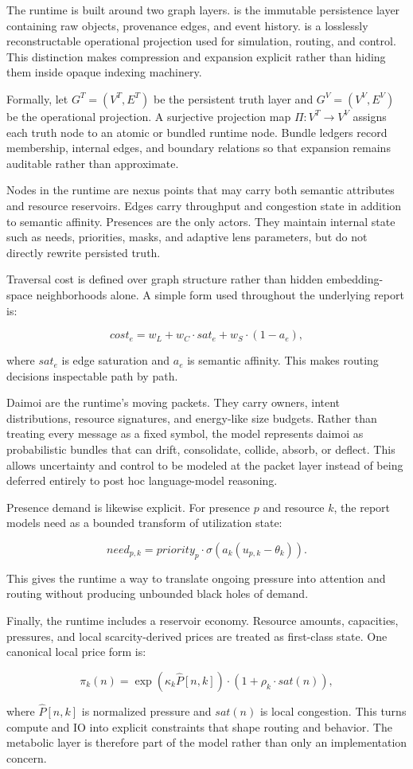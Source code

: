 The runtime is built around two graph layers. \truthgraph{} is the immutable persistence layer containing raw objects, provenance edges, and event history. \viewgraph{} is a losslessly reconstructable operational projection used for simulation, routing, and control. This distinction makes compression and expansion explicit rather than hiding them inside opaque indexing machinery.

Formally, let \(G^T=(V^T,E^T)\) be the persistent truth layer and \(G^V=(V^V,E^V)\) be the operational projection. A surjective projection map \(\Pi:V^T \to V^V\) assigns each truth node to an atomic or bundled runtime node. Bundle ledgers record membership, internal edges, and boundary relations so that expansion remains auditable rather than approximate.

Nodes in the runtime are nexus points that may carry both semantic attributes and resource reservoirs. Edges carry throughput and congestion state in addition to semantic affinity. Presences are the only actors. They maintain internal state such as needs, priorities, masks, and adaptive lens parameters, but do not directly rewrite persisted truth.

Traversal cost is defined over graph structure rather than hidden embedding-space neighborhoods alone. A simple form used throughout the underlying report is:

\[
cost_e = w_L + w_C \cdot sat_e + w_S \cdot (1-a_e),
\]

where \(sat_e\) is edge saturation and \(a_e\) is semantic affinity. This makes routing decisions inspectable path by path.

Daimoi are the runtime's moving packets. They carry owners, intent distributions, resource signatures, and energy-like size budgets. Rather than treating every message as a fixed symbol, the model represents daimoi as probabilistic bundles that can drift, consolidate, collide, absorb, or deflect. This allows uncertainty and control to be modeled at the packet layer instead of being deferred entirely to post hoc language-model reasoning.

Presence demand is likewise explicit. For presence \(p\) and resource \(k\), the report models need as a bounded transform of utilization state:

\[
need_{p,k} = priority_p \cdot \sigma\!\left(a_k(u_{p,k}-\theta_k)\right).
\]

This gives the runtime a way to translate ongoing pressure into attention and routing without producing unbounded black holes of demand.

Finally, the runtime includes a reservoir economy. Resource amounts, capacities, pressures, and local scarcity-derived prices are treated as first-class state. One canonical local price form is:

\[
\pi_k(n)=\exp(\kappa_k \hat P[n,k])\cdot (1+\rho_k \cdot sat(n)),
\]

where \(\hat P[n,k]\) is normalized pressure and \(sat(n)\) is local congestion. This turns compute and IO into explicit constraints that shape routing and behavior. The metabolic layer is therefore part of the model rather than only an implementation concern.
